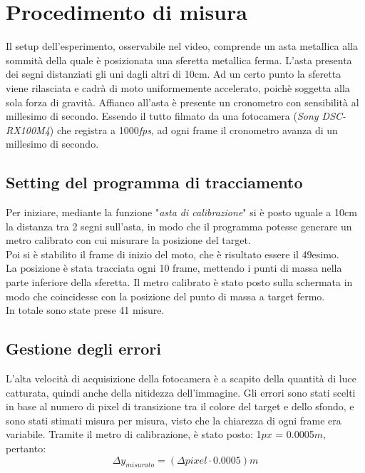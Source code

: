\documentclass[12pt, a4paper]{article}
\begin{document}
\section{Procedimento di misura}
Il setup dell'esperimento, osservabile nel video, comprende un asta metallica alla sommità della quale è posizionata una sferetta metallica ferma. L'asta presenta dei segni distanziati gli uni dagli altri di 10cm. 
Ad un certo punto la sferetta viene rilasciata e cadrà di moto uniformemente accelerato, poichè soggetta alla sola forza di gravità. Affianco all'asta è presente un cronometro con sensibilità al millesimo di secondo. 
Essendo il tutto filmato da una fotocamera (\textit{Sony DSC-RX100M4}) che registra a 1000\textit{fps}, ad ogni frame il cronometro avanza di un millesimo di secondo.

\subsection{Setting del programma di tracciamento}
Per iniziare, mediante la funzione "\textit{asta di calibrazione}" si è posto uguale a 10cm la distanza tra 2 segni sull'asta, in modo che il programma potesse generare un metro calibrato con cui misurare la posizione del target. \\
Poi si è stabilito il frame di inizio del moto, che è risultato essere il 49esimo.  \\
La posizione è stata tracciata ogni 10 frame, mettendo i punti di massa nella parte inferiore della sferetta. Il metro calibrato è stato posto sulla schermata in modo che coincidesse con la posizione del punto di massa a target fermo.\\
In totale sono state prese 41 misure.

\subsection{Gestione degli errori}
L'alta velocità di acquisizione della fotocamera è a scapito della quantità di luce catturata, quindi anche della nitidezza dell'immagine.
Gli errori sono stati scelti in base al numero di pixel di transizione tra il colore del target e dello sfondo, e sono stati stimati misura per misura, visto che la chiarezza di ogni frame era variabile. Tramite il metro di calibrazione, è stato posto: 1$px$ = 0.0005$m$, pertanto:
\begin{equation*}
    \Delta y_{misurato}= (\Delta pixel \cdot 0.0005)m
\end{equation*}
\end{document}
